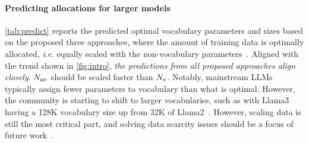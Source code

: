 \paragraph{Predicting allocations for larger models}

\autoref{tab:predict} reports the predicted optimal vocabulary parameters and sizes based on the proposed three approaches, where the amount of training data is optimally allocated, \textit{i.e.} equally scaled with the non-vocabulary parameters~\citep{hoffmann2022training}. Aligned with the trend shown in \autoref{fig:intro}, \textit{the predictions from all proposed approaches align closely}. $N_{\rm nv}$ should be scaled faster than $N_{\rm v}$. Notably, mainstream LLMs typically assign fewer parameters to vocabulary than what is optimal. However, the community is starting to shift to larger vocabularies, such as with Llama3~\cite{metallama3blog} having a 128K vocabulary size up from 32K of Llama2~\citep{touvron2023llama}. However, scaling data is still the most critical part, and solving data scarcity issues should be a focus of future work~\citep{villalobos2022will}.

\begin{table}[t]
\centering
\small
\caption{Zero-shot performance of models with $N_{nv}=2.87B$ comparing the commonly used $V=32K$ with our predicted optimal vocabulary $V^{opt}$. We consider the scenario where the number of training data is equally scaled with the non-vocabulary parameters. We report accuracy and standard deviation in percentages. Accuracy is normalized: The predicted likelihoods are divided by the length of each choice for multiple choices to eliminate the effect of text length on predictions.}
\vspace{1mm}
\label{tab:downstream-3Bmodel-optimal}
\end{table}

